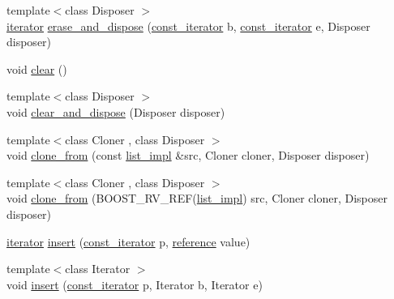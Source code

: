\begin{DoxyCompactItemize}
\item 
{\footnotesize template$<$class Disposer $>$ }\\\hyperlink{classboost_1_1intrusive_1_1list__impl_a15c0189bf62eb9fb98bc07ef10b8cb23}{iterator} \hyperlink{classboost_1_1intrusive_1_1list__impl_a9c68fe0a61da85e83ebe11bc02283bef}{erase\+\_\+and\+\_\+dispose} (\hyperlink{classboost_1_1intrusive_1_1list__impl_af4ced710fe02662c5650d161af83d8cd}{const\+\_\+iterator} b, \hyperlink{classboost_1_1intrusive_1_1list__impl_af4ced710fe02662c5650d161af83d8cd}{const\+\_\+iterator} e, Disposer disposer)
\item 
void \hyperlink{classboost_1_1intrusive_1_1list__impl_a5666d7343a0e7bad0ad0f1869c90e1b2}{clear} ()
\item 
{\footnotesize template$<$class Disposer $>$ }\\void \hyperlink{classboost_1_1intrusive_1_1list__impl_a0b07cfbe98383d57a8c27a8e389c13fc}{clear\+\_\+and\+\_\+dispose} (Disposer disposer)
\item 
{\footnotesize template$<$class Cloner , class Disposer $>$ }\\void \hyperlink{classboost_1_1intrusive_1_1list__impl_afd28996ec25e7c810d7c867e66e1fa3e}{clone\+\_\+from} (const \hyperlink{classboost_1_1intrusive_1_1list__impl}{list\+\_\+impl} \&src, Cloner cloner, Disposer disposer)
\item 
{\footnotesize template$<$class Cloner , class Disposer $>$ }\\void \hyperlink{classboost_1_1intrusive_1_1list__impl_af384af26bd41d2eeecdd6fd718435888}{clone\+\_\+from} (B\+O\+O\+S\+T\+\_\+\+R\+V\+\_\+\+R\+EF(\hyperlink{classboost_1_1intrusive_1_1list__impl}{list\+\_\+impl}) src, Cloner cloner, Disposer disposer)
\item 
\hyperlink{classboost_1_1intrusive_1_1list__impl_a15c0189bf62eb9fb98bc07ef10b8cb23}{iterator} \hyperlink{classboost_1_1intrusive_1_1list__impl_a51f571f4048e3f3e7bcb944d6f82bca0}{insert} (\hyperlink{classboost_1_1intrusive_1_1list__impl_af4ced710fe02662c5650d161af83d8cd}{const\+\_\+iterator} p, \hyperlink{classboost_1_1intrusive_1_1list__impl_a881763b587dbe7c0237a552a9e89755a}{reference} value)
\item 
{\footnotesize template$<$class Iterator $>$ }\\void \hyperlink{classboost_1_1intrusive_1_1list__impl_afabe1de903e672ab93e55782fb5f0006}{insert} (\hyperlink{classboost_1_1intrusive_1_1list__impl_af4ced710fe02662c5650d161af83d8cd}{const\+\_\+iterator} p, Iterator b, Iterator e)
\item 

\end{DoxyCompactItemize}
